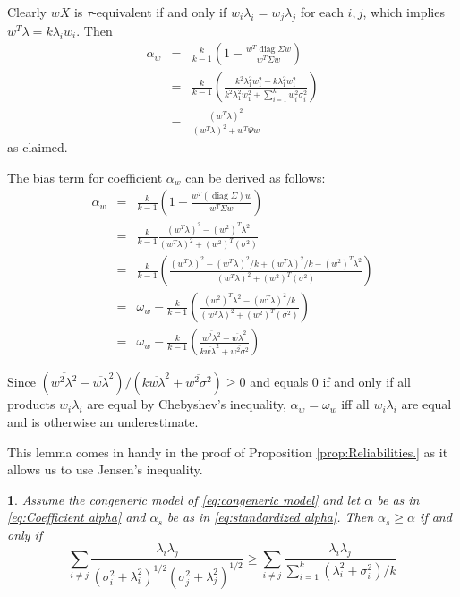 \documentclass{article}
\makeatletter
\theoremstyle{plain}
\theoremstyle{plain}
\newtheorem{lem}{\protect\lemmaname}
\theoremstyle{definition}
\theoremstyle{remark}
\theoremstyle{definition}
\theoremstyle{plain}
\theoremstyle{plain}
\theoremstyle{definition}
\newenvironment{proof}[1][\protect\proofname]{\par
	\normalfont\topsep6\p@\@plus6\p@\relax
	\trivlist
	\itemindent\parindent
	\item[\hskip\labelsep\scshape #1]\ignorespaces
}{%
	\endtrivlist\@endpefalse
}
\providecommand{\proofname}{Proof}
\providecommand{\lemmaname}{Lemma}
\DeclareMathOperator{\diag}{diag}
\renewcommand{\sqrt}[1]{{(#1)^{1/2}}}
\makeatother
\begin{document}
\begin{proof}[Proof of Proposition \ref{prop:weighted alpha}]
\label{proof:weighted alpha}Clearly $wX$ is $\tau$-equivalent
if and only if $w_{i}\lambda_{i}=w_{j}\lambda_{j}$ for each $i,j$,
which implies $w^{T}\lambda=k\lambda_{i}w_{i}$. Then
\begin{eqnarray*}
\alpha_{w} & = & \frac{k}{k-1}\left(1-\frac{w^{T}\diag\Sigma w}{w^{T}\Sigma w}\right)\\
 & = & \frac{k}{k-1}\left(\frac{k^{2}\lambda_{1}^{2}w_{1}^{2}-k\lambda_{1}^{2}w_{1}^{2}}{k^{2}\lambda_{1}^{2}w_{1}^{2}+\sum_{i=1}^{k}w_{i}^{2}\sigma_{i}^{2}}\right)\\
 & = & \frac{(w^{T}\lambda)^{2}}{(w^{T}\lambda)^{2}+w^{T}\Psi w}
\end{eqnarray*}
as claimed.

The bias term for coefficient $\alpha_w$ can be derived as follows:
\begin{eqnarray*}
\alpha_{w} & = & \frac{k}{k-1}\left(1-\frac{w^{T}(\diag\Sigma)w}{w^{T}\Sigma w}\right)\\
 & = & \frac{k}{k-1}\frac{(w^{T}\lambda)^{2}-(w^{2})^{T}\lambda^{2}}{(w^{T}\lambda)^{2}+(w^{2})^{T}(\sigma^{2})}\\
 & = & \frac{k}{k-1}\left(\frac{(w^{T}\lambda)^{2}-(w^{T}\lambda)^{2}/k+(w^{T}\lambda)^{2}/k-(w^{2})^{T}\lambda^{2}}{(w^{T}\lambda)^{2}+(w^{2})^{T}(\sigma^{2})}\right)\\
 & = & \omega_{w}-\frac{k}{k-1}\left(\frac{(w^{2})^{T}\lambda^{2}-(w^{T}\lambda)^{2}/k}{(w^{T}\lambda)^{2}+(w^{2})^{T}(\sigma^{2})}\right)\\
 & = & \omega_{w}-\frac{k}{k-1}\left(\frac{\overline{w^{2}\lambda^{2}}-\overline{w\lambda}^{2}}{k\overline{w\lambda}^{2}+\overline{w^{2}\sigma^{2}}}\right)
\end{eqnarray*}

Since $(\overline{w^{2}\lambda^{2}}-\overline{w\lambda}^{2})/(k\overline{w\lambda}^{2}+\overline{w^{2}\sigma^{2}})\geq0$
and equals $0$ if and only if all products $w_i\lambda_i$ are equal by Chebyshev's inequality, $\alpha_w=\omega_w$
iff all $w_i\lambda_i$ are equal and is otherwise an underestimate. 


\end{proof}


This lemma comes in handy in the proof of Proposition \ref{prop:Reliabilities.} as it allows us to use Jensen's inequality.

\begin{lem}
Assume the congeneric model of \eqref{eq:congeneric model} and let $\alpha$ be as in \eqref{eq:Coefficient alpha} and $\alpha_s$ be as in \eqref{eq:standardized alpha}. Then $\alpha_{s}\geq\alpha$
if and only if
\begin{equation}
\label{eq:alpha_s_alpha_inequality}
\sum_{i\neq j}\frac{\lambda_{i}\lambda_{j}}{\sqrt{\sigma_{i}^{2}+\lambda_{i}^{2}}\sqrt{\sigma_j^{2}+\lambda_{j}^{2}}} 
\geq
\sum_{i\neq j}\frac{\lambda_{i}\lambda_{j}}{\sum_{i=1}^{k}\left(\lambda_{i}^{2}+\sigma_{i}^{2}\right)/k}
\end{equation}
\end{lem}
\end{document}
